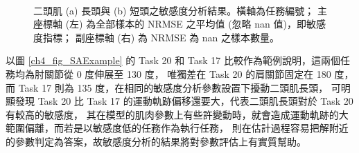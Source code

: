 \bigskip
\begin{figure}[!ht]
	\centering
	 \\
    \caption[模擬案例之敏感度分析結果]{二頭肌 (a) 長頭與 (b) 短頭之敏感度分析結果。橫軸為任務編號；
                                     主座標軸 (左) 為全部樣本的 NRMSE 之平均值 (忽略 nan 值)，即敏感度指標；
                                     副座標軸 (右) 為 NRMSE 為 nan 之樣本數量。}
    \label{ch4_fig_SAResults}
\end{figure}

以圖 \ref{ch4_fig_SAExample} 的 Task 20 和 Task 17 比較作為範例說明，這兩個任務均為肘關節從 0 度伸展至 130 度，
唯獨差在 Task 20 的肩關節固定在 180 度，而 Task 17 則為 135 度，在相同的敏感度分析參數設置下擾動二頭肌長頭，
可明顯發現 Task 20 比 Task 17 的運動軌跡偏移還要大，代表二頭肌長頭對於 Task 20 有較高的敏感度，
其在模型的肌肉參數上有些許變動時，就會造成運動軌跡的大範圍偏離，而若是以敏感度低的任務作為執行任務，
則在估計過程容易把解附近的參數判定為答案，故敏感度分析的結果將對參數評估上有實質幫助。

\clearpage

